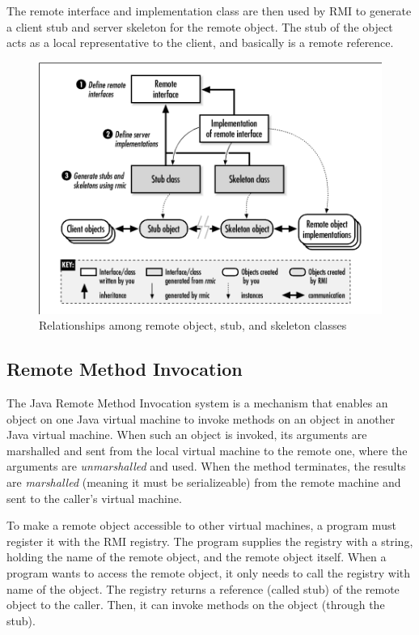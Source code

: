 The remote interface and implementation class are then used by RMI to generate a client stub and server skeleton for the remote object. The stub of the object acts as a local representative to the client, and basically is a remote reference.

\begin{figure}[ht!]
\centering
\includegraphics[width=150mm]{img/remote_object_relationship.png}
\caption{ Relationships among remote object, stub, and skeleton classes}
\label{Remote Object relationship}
\end{figure}

\subsection{Remote Method Invocation}
The Java Remote Method Invocation system is a mechanism that enables an object on one Java virtual machine to invoke methods on an object in another Java virtual machine. When such an object is invoked, its arguments are marshalled and sent from the local virtual machine to the remote one, where the arguments are \emph{unmarshalled} and used. When the method terminates, the results are \emph{marshalled} (meaning it must be serializeable) from the remote machine and sent to the caller's virtual machine.

To make a remote object accessible to other virtual machines, a program must register it with the RMI registry.
The program supplies the registry with a string, holding the name of the remote object, and the remote object itself. When a program wants to access the remote object, it only needs to call the registry with name of the object. The registry returns a reference (called stub) of the remote object to the caller. Then, it can invoke methods on the object (through the stub). 